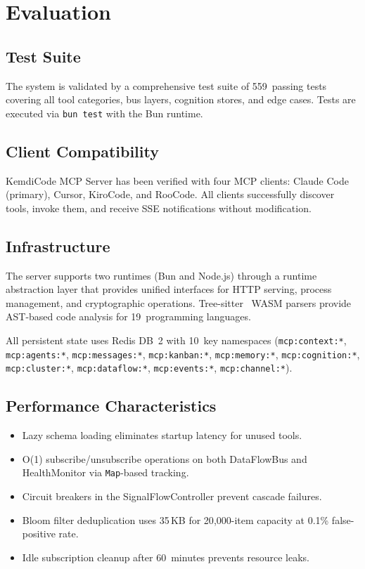 \documentclass[journal,10pt]{IEEEtran}
\newcommand{\code}[1]{\texttt{#1}}
\begin{document}
\section{Evaluation}
\label{sec:eval}

\subsection{Test Suite}

The system is validated by a comprehensive test suite of 559~passing tests covering all tool categories, bus layers, cognition stores, and edge cases. Tests are executed via \code{bun test} with the Bun runtime.

\subsection{Client Compatibility}

KemdiCode MCP Server has been verified with four MCP clients: Claude Code (primary), Cursor, KiroCode, and RooCode. All clients successfully discover tools, invoke them, and receive SSE notifications without modification.

\subsection{Infrastructure}

The server supports two runtimes (Bun and Node.js) through a runtime abstraction layer that provides unified interfaces for HTTP serving, process management, and cryptographic operations. Tree-sitter~\cite{treesitter} WASM parsers provide AST-based code analysis for 19~programming languages.

All persistent state uses Redis DB~2 with 10~key namespaces (\code{mcp:context:*}, \code{mcp:agents:*}, \code{mcp:messages:*}, \code{mcp:kanban:*}, \code{mcp:memory:*}, \code{mcp:cognition:*}, \code{mcp:cluster:*}, \code{mcp:dataflow:*}, \code{mcp:events:*}, \code{mcp:channel:*}).

\subsection{Performance Characteristics}

\begin{itemize}[nosep]
\item Lazy schema loading eliminates startup latency for unused tools.
\item O(1) subscribe/unsubscribe operations on both DataFlowBus and HealthMonitor via \code{Map}-based tracking.
\item Circuit breakers in the SignalFlowController prevent cascade failures.
\item Bloom filter deduplication uses 35\,KB for 20{,}000-item capacity at 0.1\% false-positive rate.
\item Idle subscription cleanup after 60~minutes prevents resource leaks.
\end{itemize}
\end{document}
